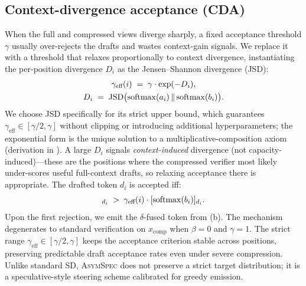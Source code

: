 \documentclass[11pt]{article}
\theoremstyle{plain}
\theoremstyle{definition}
\begin{document}
\subsection{Context-divergence acceptance (CDA)}
\label{sec:method-cda}
When the full and compressed views diverge sharply, a fixed acceptance threshold $\gamma$ usually over-rejects the drafts and wastes context-gain signals. We replace it with a threshold that relaxes proportionally to context divergence, instantiating the per-position divergence $D_i$ as the Jensen--Shannon divergence (JSD):
\vspace{-0.8em}
\begin{equation}
\begin{gathered}
    \gamma_{\text{eff}}(i) \;=\; \gamma \cdot \exp(-D_i), \\
    D_i \;=\; \mathrm{JSD}\bigl(\mathrm{softmax}(a_i)\,\|\,\mathrm{softmax}(b_i)\bigr).
\end{gathered}
\label{eq:cda}
\vspace{-0.5em}
\end{equation}
We choose JSD specifically for its strict upper bound, which guarantees $\gamma_{\text{eff}}\in[\gamma/2,\gamma]$ without clipping or introducing additional hyperparameters; the exponential form is the unique solution to a multiplicative-composition axiom (derivation in ). A large $D_i$ signals \emph{context-induced} divergence (not capacity-induced)---these are the positions where the compressed verifier most likely under-scores useful full-context drafts, so relaxing acceptance there is appropriate. The drafted token $d_i$ is accepted iff:
\vspace{-0.8em}
\begin{equation}
[\mathrm{softmax}(t_i)]_{d_i} \;>\; \gamma_{\text{eff}}(i) \cdot [\mathrm{softmax}(b_i)]_{d_i}.
\label{eq:accept}
\vspace{-0.5em}
\end{equation}
Upon the first rejection, we emit the $\delta$-fused token from  (b). The mechanism degenerates to standard verification on $x_{\text{comp}}$ when $\beta=0$ and $\gamma=1$. The strict range $\gamma_{\text{eff}}\in[\gamma/2,\gamma]$ keeps the acceptance criterion stable across positions, preserving predictable draft acceptance rates even under severe compression. Unlike standard SD, \textsc{AsymSpec} does not preserve a strict target distribution; it is a speculative-style steering scheme calibrated for greedy emission.
\end{document}
